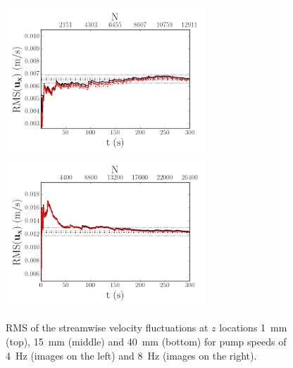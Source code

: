 \documentclass[12pt,oneside,a4paper]{article}
\begin{document}
\begin{figure}
\includegraphics[width=7.5cm]{images/LDA_timeDependenceImages/4hz_x_400_z_40_RMSux.png}\hfill
\includegraphics[width=7.5cm]{images/LDA_timeDependenceImages/8hz_x_400_z_40_RMSux.png}\\
\caption{RMS of the streamwise velocity fluctuations at $z$ locations \SI{1}{mm} (top), \SI{15}{mm} (middle) and \SI{40}{mm} (bottom) for pump speeds of \SI{4}{Hz} (images on the left) and \SI{8}{Hz} (images on the right).}
\label{figure:experiments:timeDependence:RMSux}
\end{figure}
\end{document}
